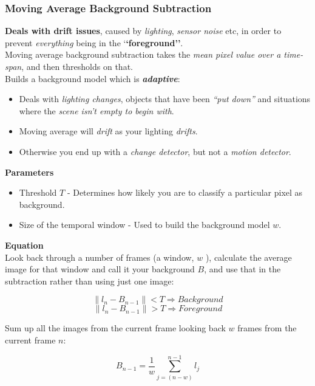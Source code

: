 \documentclass[english, 10pt]{article}
\begin{document}
\subsubsection{Moving Average Background
Subtraction}

\textbf{Deals with drift issues}, caused by \emph{lighting},
\emph{sensor noise} etc, in order to prevent \emph{everything} being in
the `\textbf{`foreground''}. \\

Moving average background subtraction takes the \textit{mean pixel value over a time-span}, and then thresholds on that. \\

Builds a background model which is \textbf{\emph{adaptive}}:

\begin{itemize}
\item
  Deals with \textit{lighting changes}, objects that have been \textit{``put down''} and
  situations where the \textit{scene isn't empty to begin with}.
\item Moving average will \textit{drift} as your lighting \textit{drifts}.  
   \item Otherwise you
  end up with a \emph{change detector}, but not a \emph{motion
  detector}.
\end{itemize}

\textbf{Parameters}

\begin{itemize}
\item
  Threshold $T$ - Determines how likely you are to classify a particular pixel as background.
  
   \item Size of the temporal window - Used to build the background model $w$.
\end{itemize}

\textbf{Equation} \\

Look back through a number of frames (a window, $w$ ), calculate the average image for that window and call it your background $B$, and use that in the subtraction rather than using just one image:

$$ \| l_n - B_{n-1} \| < T \Longrightarrow Background$$
$$ \| l_n - B_{n-1} \| > T \Longrightarrow Foreground$$

Sum up all the images from the current frame looking back $w$ frames from the current frame $n$:

$$  B_{n-1} = \frac{1}{w}\sum_{j=(n-w)}^{n-1}l_j $$
\end{document}
